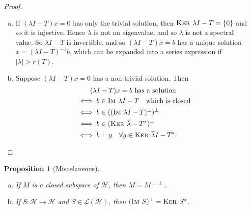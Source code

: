 \documentclass[justified]{tufte-book}
\theoremstyle{plain}%
\newtheorem{prop}[thm]{Proposition}
\theoremstyle{definition}
\theoremstyle{remark}
\newcommand{\im}{\textsc{Im\ }}
\renewcommand{\ker}{\textsc{Ker\ }}
\begin{document}
\begin{proof}
  {\ } \begin{enumerate}[(a)]
      \item If $(\lambda I - T) x = 0$ has only the trivial solution, then $\ker \lambda I - T = \{ 0 \}$ and so it is injective.  Hence $\lambda$ is not an eigenvalue, and so $\lambda$ is not a spectral value.  So $\lambda I - T$ is invertible, and so $(\lambda I - T) x = b$ has a unique solution $x = (\lambda I - T)^{-1} b$, which can be expanded into a series expression if $|\lambda| > r(T)$.  
      \item Suppose $(\lambda I - T) x = 0$ has a non-trivial solution.  Then
      \begin{align*}
          &\qquad\text{$(\lambda I - T) x = b$ has a solution} \\
          &\iff b \in \im \lambda I - T \quad \text{which is closed} \\
          &\iff b \in ((\im \lambda I - T)^\perp)^\perp \\
          &\iff b \in (\ker \overline \lambda - T^*)^\perp \\
          &\iff b \perp y \quad \forall y \in \ker \overline \lambda I - T^*.\qedhere
      \end{align*}
  \end{enumerate}
\end{proof}

\begin{prop}[Miscelaneous]{\ }\begin{enumerate}[(a)]
  \item If $M$ is a closed subspace of $\mathcal H$, then $M = M^{\perp \perp}$. 
  \item If $S: \mathcal H \rightarrow \mathcal H$ and $S \in \mathcal L(\mathcal H)$, then $(\im S)^\perp = \ker S^*$.  
\end{enumerate}
\end{prop}
\end{document}
